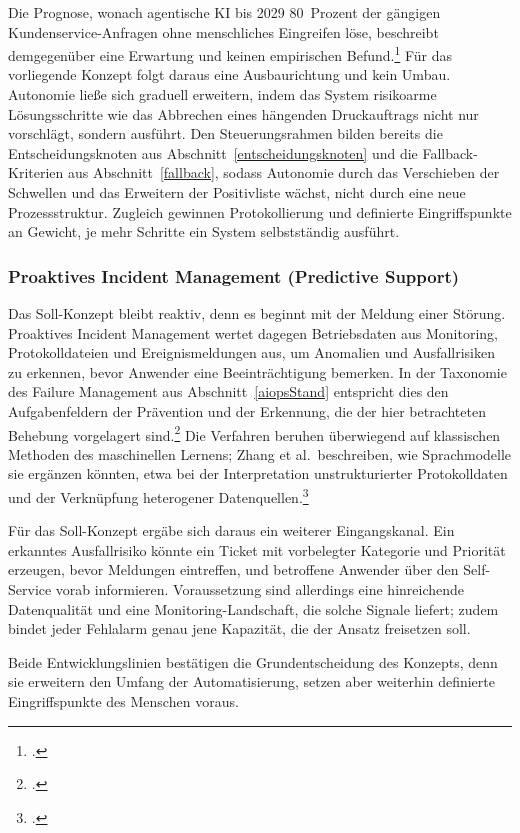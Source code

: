 Die Prognose, wonach agentische KI bis 2029 80~Prozent der g\"angigen Kundenservice-Anfragen ohne menschliches Eingreifen l\"ose, beschreibt demgegen\"uber eine Erwartung und keinen empirischen Befund.\footcite[Vgl.][o.~S.]{Gartner2025} F\"ur das vorliegende Konzept folgt daraus eine Ausbaurichtung und kein Umbau. Autonomie lie{\ss}e sich graduell erweitern, indem das System risikoarme L\"osungsschritte wie das Abbrechen eines h\"angenden Druckauftrags nicht nur vorschl\"agt, sondern ausf\"uhrt. Den Steuerungsrahmen bilden bereits die Entscheidungsknoten aus Abschnitt~\ref{entscheidungsknoten} und die Fallback-Kriterien aus Abschnitt~\ref{fallback}, sodass Autonomie durch das Verschieben der Schwellen und das Erweitern der Positivliste w\"achst, nicht durch eine neue Prozessstruktur. Zugleich gewinnen Protokollierung und definierte Eingriffspunkte an Gewicht, je mehr Schritte ein System selbstst\"andig ausf\"uhrt.

\subsubsection{Proaktives Incident Management (Predictive Support)}
\label{predictive}

Das Soll-Konzept bleibt reaktiv, denn es beginnt mit der Meldung einer St\"orung. Proaktives Incident Management wertet dagegen Betriebsdaten aus Monitoring, Protokolldateien und Ereignismeldungen aus, um Anomalien und Ausfallrisiken zu erkennen, bevor Anwender eine Beeintr\"achtigung bemerken. In der Taxonomie des Failure Management aus Abschnitt~\ref{aiopsStand} entspricht dies den Aufgabenfeldern der Pr\"avention und der Erkennung, die der hier betrachteten Behebung vorgelagert sind.\footcite[Vgl.][S.~7]{Notaro2021} Die Verfahren beruhen \"uberwiegend auf klassischen Methoden des maschinellen Lernens; Zhang et al.~beschreiben, wie Sprachmodelle sie erg\"anzen k\"onnten, etwa bei der Interpretation unstrukturierter Protokolldaten und der Verkn\"upfung heterogener Datenquellen.\footcite[Vgl.][hier S.~1 und 8]{Zhang2025}

F\"ur das Soll-Konzept erg\"abe sich daraus ein weiterer Eingangskanal. Ein erkanntes Ausfallrisiko k\"onnte ein Ticket mit vorbelegter Kategorie und Priorit\"at erzeugen, bevor Meldungen eintreffen, und betroffene Anwender \"uber den Self-Service vorab informieren. Voraussetzung sind allerdings eine hinreichende Datenqualit\"at und eine Monitoring-Landschaft, die solche Signale liefert; zudem bindet jeder Fehlalarm genau jene Kapazit\"at, die der Ansatz freisetzen soll.

Beide Entwicklungslinien best\"atigen die Grundentscheidung des Konzepts, denn sie erweitern den Umfang der Automatisierung, setzen aber weiterhin definierte Eingriffspunkte des Menschen voraus.
